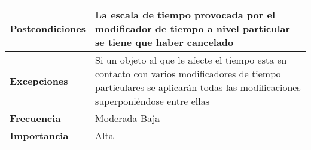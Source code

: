 \begin{longtable}{l|l}
\begin{minipage}{0.25\columnwidth}
\textbf{Postcondiciones} 
\end{minipage}
&
\begin{minipage}{0.65\columnwidth}
La escala de tiempo provocada por el modificador de tiempo a nivel particular se tiene que haber cancelado
\end{minipage}
\\ \hline

\begin{minipage}{0.25\columnwidth}
\textbf{Excepciones} 
\end{minipage}
&
\begin{minipage}{0.65\columnwidth}
Si un objeto al que le afecte el tiempo esta en contacto con varios modificadores de tiempo particulares se aplicarán todas las modificaciones superponiéndose entre ellas 
\end{minipage}
\\ \hline

\begin{minipage}{0.25\columnwidth}
\textbf{Frecuencia} 
\end{minipage}
&
\begin{minipage}{0.65\columnwidth}
Moderada-Baja
\end{minipage}
\\ \hline

\begin{minipage}{0.25\columnwidth}
\textbf{Importancia} 
\end{minipage}
&
\begin{minipage}{0.65\columnwidth}
Alta
\end{minipage}
\\ \hline
\end{longtable}

